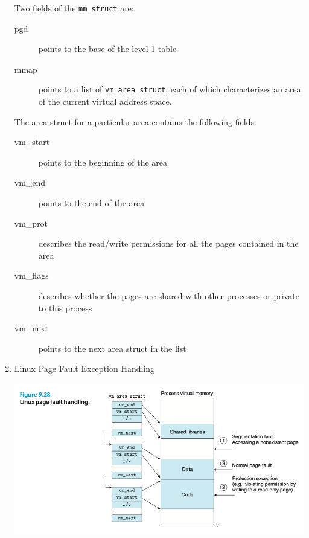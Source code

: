 \documentclass[11pt]{article}
\begin{document}
\begin{enumerate}
Two fields of the \texttt{mm\_struct} are:\\
\begin{description}
\item[{pgd}] points to the base of the level 1 table\\
\item[{mmap}] points to a list of \texttt{vm\_area\_struct}, each of which characterizes an area of the current virtual address space.\\
\end{description}

The area struct for a particular area contains the following fields:\\
\begin{description}
\item[{vm\_start}] points to the beginning of the area\\
\item[{vm\_end}] points to the end of the area\\
\item[{vm\_prot}] describes the read/write permissions for all the pages contained in the area\\
\item[{vm\_flags}] describes whether the pages are shared with other processes or private to this process\\
\item[{vm\_next}] points to the next area struct in the list\\
\end{description}


\item Linux Page Fault Exception Handling
\label{sec:org90327e8}

\begin{center}
\includegraphics[width=.9\linewidth]{pics/figure9.28-page-fault.png}
\end{center}


\end{enumerate}
\end{document}

